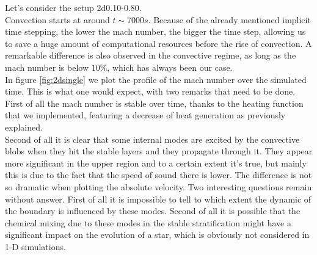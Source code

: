 Let's consider the setup 2d0.10-0.80. \\
Convection starts at around $t \sim 7000 s$. Because of the already mentioned implicit time stepping, the lower the mach number, the bigger the time step, allowing us to save a huge amount of computational resources before the rise of convection. A remarkable difference is also observed in the convective regime, as long as the mach number is below $10 \%$, which has always been our case.\\
In figure \ref{fig:2dsingle} we plot the profile of the mach number over the simulated time. This is what one would expect, with two remarks that need to be done. \\
First of all the mach number is stable over time, thanks to the heating function that we implemented, featuring a decrease of heat generation as previously explained. \\
Second of all it is clear that some internal modes are excited by the convective blobs when they hit the stable layers and they propagate through it. They appear more significant in the upper region and to a certain extent it's true, but mainly this is due to the fact that the speed of sound there is lower. The difference is not so dramatic when plotting the absolute velocity. Two interesting questions remain without answer. First of all it is impossible to tell to which extent the dynamic of the boundary is influenced by these modes. Second of all it is possible that the chemical mixing due to these modes in the stable stratification might have a significant impact on the evolution of a star, which is obviously not considered in 1-D simulations.\\
